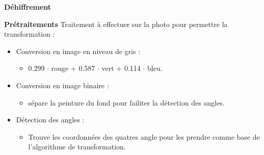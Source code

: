 \documentclass{beamer}
\begin{document}
\begin{frame}[t]
\begin{columns}[t]

            \begin{column}{.5\linewidth}
                \begin{center}
                    {\textbf{Déhiffrement}}
                \end{center}


                \begin{block}{\centering \textbf{Prétraitements}}
                    Traitement à effectuer sur la photo pour permettre la transformation :
                    \begin{itemize}[label=\textbullet]
                        \item Conversion en image en niveau de gris :
                        \begin{itemize}[label=$\rightarrow$]
                            \item 0.299 $\cdot$ rouge + 0.587 $\cdot$ vert + 0.114 $\cdot$ bleu.
                        \end{itemize}
                        \item Conversion en image binaire :
                        \begin{itemize}[label=$\rightarrow$]
                            \item sépare la peinture du fond pour failiter la détection des angles.
                        \end{itemize}
                        \item Détection des angles :
                        \begin{itemize}[label=$\rightarrow$]
                            \item Trouve les coordonnées des quatres angle pour les prendre comme base de l'algorithme de transformation.
                        \end{itemize}
                    \end{itemize}
                \end{block}


\end{column}
\end{columns}
\end{frame}
\end{document}
